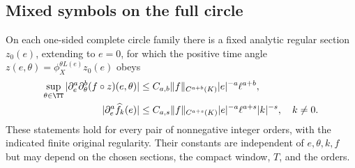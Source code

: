 \subsection{Mixed symbols on the full circle}

\begin{proposition}\label{prop:mixed-symbols}
On each one-sided complete circle family there is a fixed analytic
regular section $z_0(e)$, extending to $e=0$, for which the positive
time angle $z(e,\theta)=\phi_X^{\theta L(e)}z_0(e)$ obeys
\begin{align}
 \sup_{\theta\in\TT}
 |\partial_e^a\partial_\theta^b(f\circ z)(e,\theta)|
 &\le C_{a,b}\|f\|_{C^{a+b}(K)}
            |e|^{-a}\ell^{a+b},\label{eq:hyp-mixed-est}\\
 |\partial_e^a\widehat f_k(e)|
 &\le C_{a,s}\|f\|_{C^{a+s}(K)}
            |e|^{-a}\ell^{a+s}|k|^{-s},\quad k\ne0.
            \label{eq:hyp-fourier-est}
\end{align}
These statements hold for every pair of nonnegative integer orders,
with the indicated finite original regularity.  Their constants are
independent of $e,\theta,k,f$ but may depend on the chosen sections,
the compact window, $T$, and the orders.
\end{proposition}

